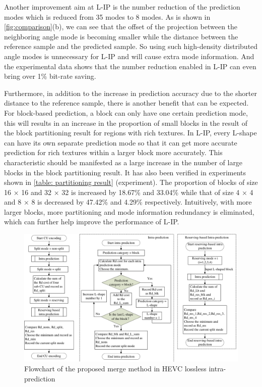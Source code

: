 \documentclass[journal]{IEEEtran}
\begin{document}
Another improvement aim at L-IP is the number reduction of the prediction modes which is reduced from 35 modes to 8 modes. As is shown in \autoref{fig:comparison}(b), we can see that the offset of the projection between the neighboring angle mode is becoming smaller while the distance between the reference sample and the predicted sample. So using such high-density distributed angle modes is unnecessary for L-IP and will cause extra mode information. And the experimental data shows that the number reduction enabled in L-IP can even bring over 1\% bit-rate saving.

Furthermore, in addition to the increase in prediction accuracy due to the shorter distance to the reference sample, there  is another benefit that can be expected. For block-based prediction, a block can only have one certain prediction mode, this will results in an increase in the proportion of small blocks in the result of the block partitioning result for regions with rich textures. In L-IP, every L-shape can have its own separate prediction mode so that it can get more accurate prediction for rich textures within a larger block more accurately. This characteristic should be manifested as a large increase in the number of large blocks in the block partitioning result. It has also been verified in experiments shown in \autoref{table: partitioning result} (experiment). The proportion of blocks of size 16 × 16 and 32 × 32 is increased by 18.67\% and 33.04\% while that of size 4 × 4 and 8 × 8 is decreased by 47.42\% and 4.29\% respectively. Intuitively, with more larger blocks, more partitioning and mode information redundancy is eliminated, which can further help improve the performance of L-IP.



\begin{figure}[htpb]
\centering
\includegraphics[width=18cm]{pictures/flowchart}
\caption{Flowchart of the proposed merge method in HEVC lossless intra-prediction}
\label{fig:flowchart}
\end{figure}
\end{document}
